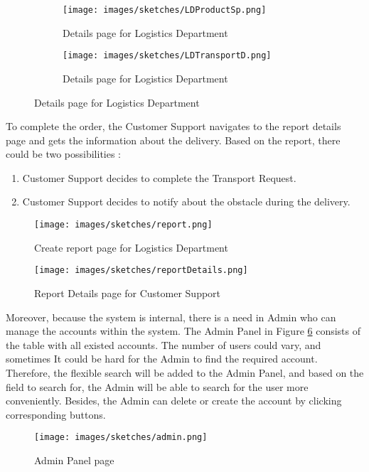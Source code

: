 \documentclass[a4paper]{article}
\begin{document}
      \begin{figure}[H]
        \centering %
        \begin{subfigure}{0.5\textwidth}
        \texttt{[image: images/sketches/LDProductSp.png]}
        \caption{ Details page for Logistics Department}
        \label{LDDetailsProductSp}
    \end{subfigure}\hfil %
    \begin{subfigure}{0.5\textwidth}
        \texttt{[image: images/sketches/LDTransportD.png]}
        \caption{Details page for Logistics Department}
    \label{LDDetailsTransportReq}
    \end{subfigure}\hfil %
    \end{figure}
    
    
       
    To complete the order, the Customer Support navigates to the report details page and gets the information about the delivery. Based on the report, there could be two possibilities :
    \begin{enumerate}
        \item Customer Support decides to complete the Transport Request.
        \item Customer Support decides to notify about the obstacle during the delivery.
    \end{enumerate}
    
        
     \begin{figure}[H]
     \centering
     \texttt{[image: images/sketches/report.png]}
     \caption{Create report page for Logistics Department}
     \label{ReporPage}
    \end{figure}
    
     \begin{figure}[H]
     \centering
     \texttt{[image: images/sketches/reportDetails.png]}
     \caption {Report Details page for Customer Support}
     \label{ReporPageDetails}
    \end{figure}
    
    
    Moreover, because the system is internal, there is a need in Admin who can manage the accounts within the system. The Admin Panel in Figure \ref{adminPanel} consists of the table with all existed accounts. The number of users could vary, and sometimes It could be hard for the Admin to find the required account. Therefore, the flexible search will be added to the Admin Panel, and based on the field to search for, the Admin will be able to search for the user more conveniently. Besides, the Admin can delete or create the account by clicking corresponding buttons.
     \begin{figure}[H]
     \centering
     \texttt{[image: images/sketches/admin.png]}
     \caption{Admin Panel page}
     \label{adminPanel}
    \end{figure}
    
\end{document}

